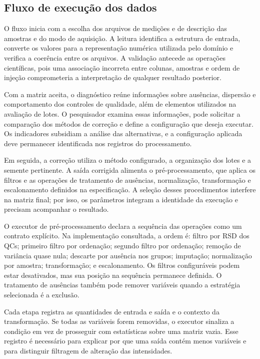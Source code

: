 \subsection{Fluxo de execução dos dados}

O fluxo inicia com a escolha dos arquivos de medições e de descrição das amostras e do modo de aquisição. A leitura identifica a estrutura de entrada, converte os valores para a representação numérica utilizada pelo domínio e verifica a coerência entre os arquivos. A validação antecede as operações científicas, pois uma associação incorreta entre colunas, amostras e ordem de injeção comprometeria a interpretação de qualquer resultado posterior.

Com a matriz aceita, o diagnóstico reúne informações sobre ausências, dispersão e comportamento dos controles de qualidade, além de elementos utilizados na avaliação de lotes. O pesquisador examina essas informações, pode solicitar a comparação dos métodos de correção e define a configuração que deseja executar. Os indicadores subsidiam a análise das alternativas, e a configuração aplicada deve permanecer identificada nos registros do processamento.

Em seguida, a correção utiliza o método configurado, a organização dos lotes e a semente pertinente. A saída corrigida alimenta o pré-processamento, que aplica os filtros e as operações de tratamento de ausências, normalização, transformação e escalonamento definidos na especificação. A seleção desses procedimentos interfere na matriz final; por isso, os parâmetros integram a identidade da execução e precisam acompanhar o resultado.

O executor de pré-processamento declara a sequência das operações como um contrato explícito. Na implementação consultada, a ordem é: filtro por RSD dos QCs; primeiro filtro por ordenação; segundo filtro por ordenação; remoção de variância quase nula; descarte por ausência nos grupos; imputação; normalização por amostra; transformação; e escalonamento. Os filtros configuráveis podem estar desativados, mas sua posição na sequência permanece definida. O tratamento de ausências também pode remover variáveis quando a estratégia selecionada é a exclusão.

Cada etapa registra as quantidades de entrada e saída e o contexto da transformação. Se todas as variáveis forem removidas, o executor sinaliza a condição em vez de prosseguir com estatísticas sobre uma matriz vazia. Esse registro é necessário para explicar por que uma saída contém menos variáveis e para distinguir filtragem de alteração das intensidades.

